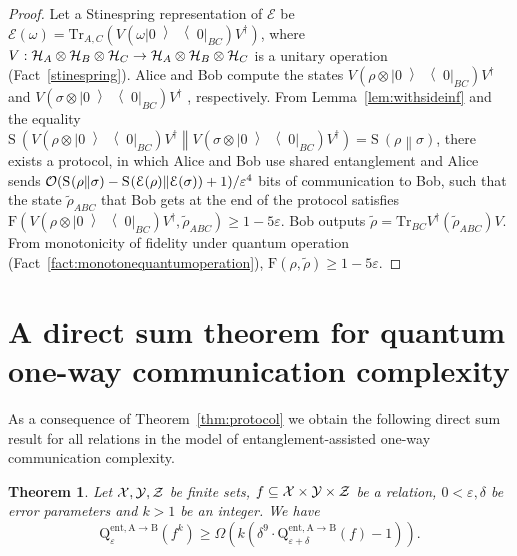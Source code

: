 \documentclass[11pt,a4paper]{article}
\def\F{\mathrn{F}}
\def\X{\CMcal{X}}
\def\Y{\CMcal{Y}}
\def\Z{\CMcal{Z}}
\def\O{\CMcal{O}}
\def\H{\CMcal{H}}
\theoremstyle{plain}
\newtheorem{theorem}{Theorem}[section]
\theoremstyle{definition}
\newcommand {\br} [1] {\ensuremath{ \left( #1 \right) }}
\newcommand {\minusspace} {\: \! \!}
\newcommand {\fn} [2] {\ensuremath{ #1 \minusspace \br{ #2 } }}
\newcommand {\relent} [2] {\fn{\mathrm{S}}{#1 \middle\| #2}}
\newcommand {\ketbratwo} [2] {\ensuremath{ \left| #1 \middle\rangle \middle\langle #2 \right| }}
\newcommand {\ketbra} [1] {\ketbratwo{#1}{#1}}
\newcommand {\Tr} {\ensuremath{ \mathrm{Tr} }}
\def\ve{{\varepsilon}}
\def\F{\mathrm{F}}
\def\E{\mathcal{E}}
\newcommand{\dqcc}[3]{\mathrm{Q}^{\text{ent},\text{A}\rightarrow\text{B} #1}_{#2}\br{#3}}
\begin{document}
\begin{proof}
Let a Stinespring representation of $\E$ be 
$\E(\omega) = 
\Tr_{A,C}\br{V (\omega \ketbra{0}_{BC})V^{\dagger}}$, where  $V:\H_A \otimes \H_B \otimes \H_C \rightarrow \H_A \otimes \H_B\otimes \H_C$ is a unitary operation (Fact~\ref{stinespring}). Alice and Bob compute the states $V\br{\rho\otimes\ketbra{0}_{BC}} V^{\dagger}$ and $V\br{\sigma\otimes\ketbra{0}_{BC}} V^{\dagger}$ , respectively. From Lemma~\ref{lem:withsideinf} and the equality $\relent{V\br{\rho\otimes\ketbra{0}_{BC}}V^{\dagger}}{V\br{\sigma\otimes\ketbra{0}_{BC}} V^{\dagger}}=\relent{\rho}{\sigma}$, there exists a protocol, in which Alice and Bob use shared entanglement and Alice sends $\O(\relent{\rho}{\sigma}-\relent{\E(\rho)}{\E(\sigma)}+1)/\ve^4 $ bits of communication to Bob, such that the state $\tilde{\rho}_{ABC}$ that Bob gets at the end of the protocol satisfies  $\F(V\br{\rho\otimes\ketbra{0}_{BC}} V^{\dagger},\tilde{\rho}_{ABC})\geq1-5\ve$.  Bob outputs $\tilde{\rho} = \Tr_{BC} V^{\dagger}\br{\tilde{\rho}_{ABC}} V $. From monotonicity of fidelity under quantum operation (Fact~\ref{fact:monotonequantumoperation}), $\F(\rho,  \tilde{\rho} )\geq1-5\ve$. 
\end{proof}

\section{A direct sum theorem for quantum one-way communication complexity}
\label{sec:directsum}

As a consequence of Theorem~\ref{thm:protocol} we obtain the following direct sum result for all relations in the model of entanglement-assisted one-way communication complexity. 

\begin{theorem}\label{thm:directsumoneway}
Let $\X,\Y,\Z$ be finite sets, $f\subseteq\X\times\Y\times\Z$ be a relation, $0<\ve,\delta$ be error parameters and $k>1$ be an integer. We have
\[\dqcc{}{\ve}{f^k}\geq \Omega \br{k \br{\delta^9\cdot\dqcc{}{\ve+\delta}{f}-1}}.\]
\end{theorem}
\end{document}
